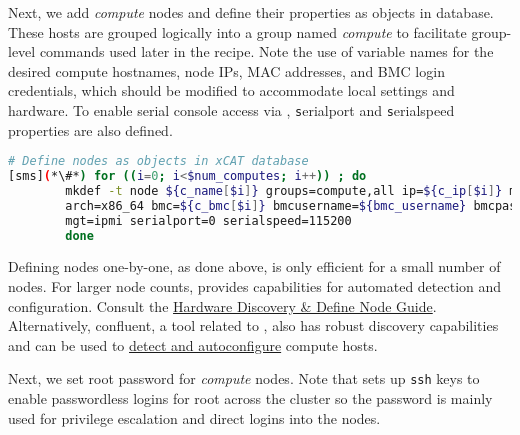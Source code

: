 
\noindent Next, we add {\em compute} nodes and define their properties as
objects in \xCAT{} database. 
These hosts are grouped logically into a group named {\em
compute} to facilitate group-level commands used later in the recipe.  Note the
use of variable names for the desired compute hostnames, node IPs, MAC
addresses, and BMC login credentials, which should be modified to accommodate
local settings and hardware. To enable serial console access via  \xCAT{}, 
{\texttt serialport} and {\texttt serialspeed}
properties are also defined.

\begin{lstlisting}[language=bash,keywords={},upquote=true,basicstyle=\footnotesize\ttfamily,]
# Define nodes as objects in xCAT database
[sms](*\#*) for ((i=0; i<$num_computes; i++)) ; do
		mkdef -t node ${c_name[$i]} groups=compute,all ip=${c_ip[$i]} mac=${c_mac[$i]} netboot=xnba \
		arch=x86_64 bmc=${c_bmc[$i]} bmcusername=${bmc_username} bmcpassword=${bmc_password} \
		mgt=ipmi serialport=0 serialspeed=115200 
        done
\end{lstlisting}

\begin{center}
  \begin{tcolorbox}[]
    \small 
Defining nodes one-by-one, as done above, is only efficient
for a small number of nodes. For larger node counts,
\xCAT{} provides capabilities for automated detection and
configuration.
Consult the
\href{http://xcat-docs.readthedocs.io/en/stable/guides/admin-guides/manage_clusters/ppc64le/discovery/}{\color{blue}\xCAT{}
Hardware Discovery \& Define Node Guide}. Alternatively, confluent, a tool
related to \xCAT{}, also has robust discovery capabilities and can be used to
\href{https://hpc.lenovo.com/users/documentation/confluentdisco.html}{\color{blue}detect
and autoconfigure} compute hosts.  
\end{tcolorbox}
\end{center}


Next, we set root password for {\em compute} nodes. Note that \xCAT{} sets up 
\texttt{ssh} keys to enable passwordless logins for root across the cluster 
so the password is mainly used for privilege escalation and direct logins into
the nodes.

